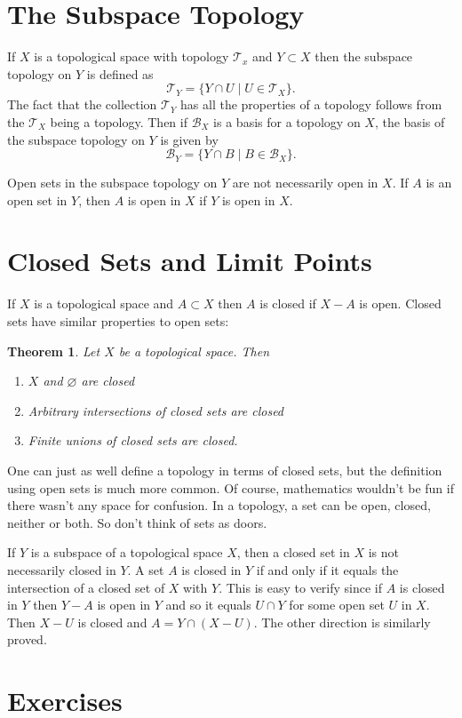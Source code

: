 \documentclass{article}
\newcommand{\Ba}{\mathcal{B}}
\newcommand{\Ta}{\mathcal{T}}
\newtheorem{theorem}{Theorem}[section]
\theoremstyle{remark}
\begin{document}
\section{The Subspace Topology}
If $X$ is a topological space with topology $\Ta_x$ and $Y\subset X$ then the subspace topology on $Y$ is defined as
$$
    \Ta_Y=\{Y\cap U\mid U\in\Ta_X\}.
$$
The fact that the collection $\Ta_Y$ has all the properties of a topology follows from the $\Ta_X$ being a topology.
Then if $\Ba_X$ is a basis for a topology on $X$, the basis of the subspace topology on $Y$ is given by
$$
    \Ba_Y=\{Y\cap B\mid B\in\Ba_X\}.
$$

Open sets in the subspace topology on $Y$ are not necessarily open in $X$.
If $A$ is an open set in $Y$, then $A$ is open in $X$ if $Y$ is open in $X$.

\section{Closed Sets and Limit Points}
If $X$ is a topological space and $A\subset X$ then $A$ is closed if $X-A$ is open.
Closed sets have similar properties to open sets:
\begin{theorem}
    Let $X$ be a topological space. Then
    \begin{enumerate}
        \item $X$ and $\varnothing$ are closed
        \item Arbitrary intersections of closed sets are closed
        \item Finite unions of closed sets are closed.
    \end{enumerate}
\end{theorem}
One can just as well define a topology in terms of closed sets, but the definition using open sets is much more common.
Of course, mathematics wouldn't be fun if there wasn't any space for confusion. In a topology, a set can be open, closed, neither or both. 
So don't think of sets as doors. 

If $Y$ is a subspace of a topological space $X$, then a closed set in $X$ is not necessarily closed in $Y$.
A set $A$ is closed in $Y$ if and only if it equals the intersection of a closed set of $X$ with $Y$. 
This is easy to verify since if $A$ is closed in $Y$ then $Y-A$ is open in $Y$ and so it equals $U\cap Y$ for some open set $U$ in $X$. 
Then $X-U$ is closed and $A=Y\cap(X-U)$. The other direction is similarly proved.




\newpage
\section{Exercises}

    
\end{document}
